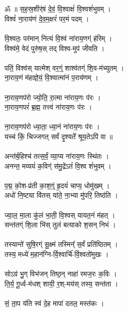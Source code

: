 \section{}
ॐ ॥ स॒ह॒स्र॒शीर्॑षं दे॒वं॒ वि॒श्वाक्षं॑ वि॒श्वशं॑भुवम् ।\\
विश्वं॑ ना॒राय॑णं दे॒व॒म॒क्षरं॑ पर॒मं पदम् ।\\
\\
वि॒श्वतः॒ पर॑मान् नित्यं वि॒श्वं ना॑राय॒णग्ं ह॑रिम् ।\\
विश्व॑मे॒ वेदं पुरु॑ष॒स् तद् विश्व-मुप॑ जीवति ।\\
\\
पतिं॒ विश्व॑स् यात्मेश् वर॒ग्ं॒ शाश्व॑तग्ं शि॒व-म॑च्युतम् ।\\
ना॒राय॒णं म॑हाज्ञे॒यं॒ वि॒श्वात्मा॑नं प॒राय॑णम् ।\\
\\
ना॒राय॒णप॑रो ज्यो॒ति॒ रा॒त्मा ना॑राय॒णः प॑रः ।\\
ना॒राय॒णपरं॑ ब्र॒ह्म॒ तत्त्वं ना॑राय॒णः प॑रः ।\\
\\
ना॒राय॒णप॑रो ध्या॒ता॒ ध्या॒नं ना॑राय॒णः प॑रः ।\\
यच्च॑ किं॒ चिज्जगत् सर्वं दृ॒श्यते᳚ श्रूय॒तेऽपि॑ वा ॥\\
\\
अन्त॑र्ब॒हिश्च॑ तत्स॒र्वं॒ व्या॒प्य ना॑राय॒णः स्थि॑तः ।\\
अनन्त॒ मव्ययं॑ क॒विग्ं स॑मु॒द्रेंऽतं॑ वि॒श्व शं॑भुवम् ।\\
\\
प॒द्म॒ को॒श-प्र॑ती का॒श॒ग्ं॒ हृ॒दयं॑ चाप्य॒ धोमु॑खम् ।\\
अधो॑ नि॒ष्ट्या वि॑तस् यांते॒ ना॒भ्या मु॑परि॒ तिष्ठ॑ति ।\\
\\
ज्वा॒ल॒ मा॒ला  कु॑लं भा॒ती॒ वि॒श्वस् यायत॒नं म॑हत् ।\\
सन्त॑तग्ं शि॒ला भि॑स् तुलं बत्याको श॒सन् निभं ।\\
\\
तस्यान्ते॑ सुषि॒रग्ं सू॒क्ष्मं तस्मिन्᳚ स॒र्वं प्रति॑ष्ठितम् ।\\
तस्य॒ मध्ये॑ म॒हान॑ग्नि-र्वि॒श्वार्चि॑-र्वि॒श्वतो॑मुखः ।\\
\\
सोऽग्र॑ भु॒ग्  विभ॑जन्  तिष्ठ॒न्  नाहा॑ रमज॒रः क॒विः ।\\
ति॒र्य॒ गू॒र्ध्व-म॑धश् शायी॒ र॒श्-मय॑स् तस्य॒ सन्त॑ता ।\\
\\
सं॒ ता॒प य॑ति स्वं दे॒ह मापा॑ दतल॒ मस्त॑कः ।\\
